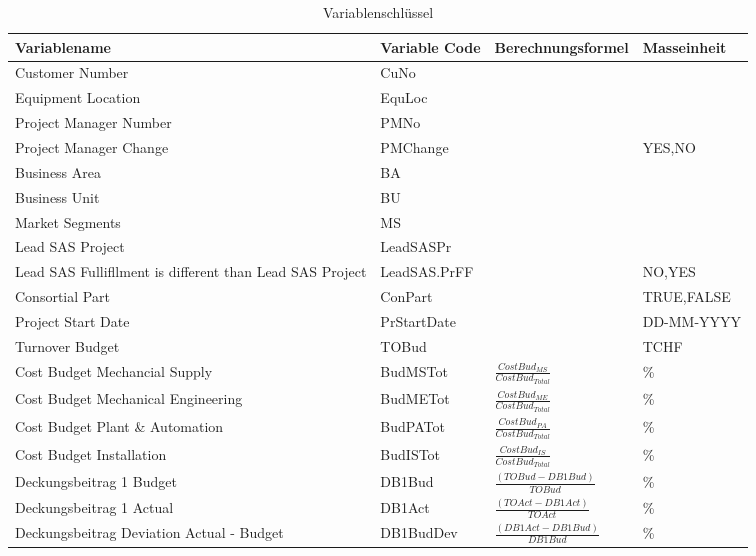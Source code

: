 \newpage\begin{landscape}
	\begin{center}
		\begin{longtable}{p{6cm}|p{4cm}|p{6cm}|p{3cm}}
			\caption{Variablenschlüssel}\\\hline
			\textbf{Variablename} & \textbf{Variable Code} & {\textbf{Berechnungsformel}} & {\textbf{Masseinheit}} \\\hline\endhead
			Customer Number & CuNo  &       &  \\
			Equipment Location & EquLoc &       &  \\
			Project Manager Number & PMNo  &       &  \\
			Project Manager Change & PMChange &       & \multicolumn{1}{l}{{YES,NO}} \\
			Business Area & BA    &       &  \\
			Business Unit & BU    &       &  \\
			Market Segments & MS    &       &  \\
			Lead SAS Project & LeadSASPr &       &  \\
			Lead SAS Fullifllment is different than Lead SAS Project & LeadSAS.PrFF &       & \multicolumn{1}{l}{{NO,YES}} \\
			Consortial Part & ConPart &       & \multicolumn{1}{l}{{TRUE,FALSE}} \\
			Project Start Date & PrStartDate &       & \multicolumn{1}{l}{DD-MM-YYYY} \\
			Turnover Budget & TOBud &       & \multicolumn{1}{l}{TCHF} \\
			Cost Budget Mechancial Supply & BudMSTot & $\frac{Cost Bud_{MS}}{Cost Bud_{Total}}$ & \multicolumn{1}{l}{\%} \\ [3mm]
			Cost Budget Mechanical Engineering & BudMETot & $\frac{Cost Bud_{ME}}{Cost Bud_{Total}}$ & \multicolumn{1}{l}{\%} \\ [3mm]
			Cost Budget Plant \& Automation & BudPATot & $\frac{Cost Bud_{PA}}{Cost Bud_{Total}}$ & \multicolumn{1}{l}{\%} \\ [3mm]
			Cost Budget Installation  & BudISTot & $\frac{Cost Bud_{IS}}{Cost Bud_{Total}}$ & \multicolumn{1}{l}{\%} \\ [3mm]
			Deckungsbeitrag 1 Budget & DB1Bud &  $\frac{(TOBud - DB1Bud)}{TOBud}$ & \multicolumn{1}{l}{\%} \\ [3mm]
			Deckungsbeitrag 1 Actual & DB1Act & $\frac{(TOAct - DB1Act)}{TOAct}$ & \multicolumn{1}{l}{\%} \\ [3mm]
			Deckungsbeitrag Deviation Actual - Budget & DB1BudDev &  $\frac{(DB1 Act-DB1 Bud)}{DB1 Bud}$     & \multicolumn{1}{l}{\%} \\ [3mm]

\end{longtable}
\end{center}
\end{landscape}
